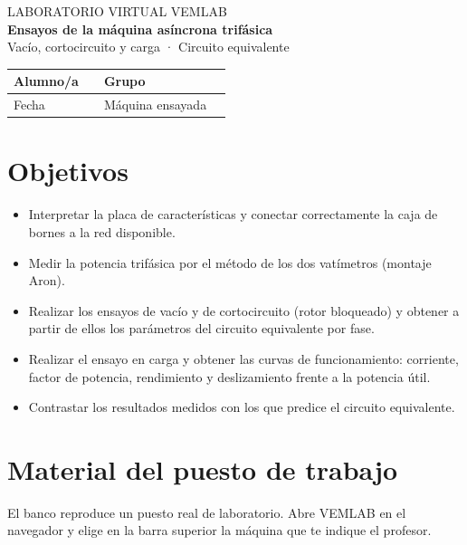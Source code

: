 \documentclass[11pt,a4paper]{article}
\begin{document}
\begin{center}
  {\sffamily\small\color{acento} LABORATORIO VIRTUAL VEMLAB}\\[4pt]
  {\sffamily\LARGE\bfseries Ensayos de la máquina asíncrona trifásica}\\[4pt]
  {\sffamily\large Vacío, cortocircuito y carga · Circuito equivalente}
\end{center}

\vspace{6pt}
\begin{tabularx}{\textwidth}{|l|X|l|X|}
  \hline
  \textsf{Alumno/a} & & \textsf{Grupo} & \\ \hline
  \textsf{Fecha} & & \textsf{Máquina ensayada} & \\ \hline
\end{tabularx}

\section{Objetivos}
\begin{itemize}
  \item Interpretar la placa de características y conectar correctamente la caja de bornes a la red disponible.
  \item Medir la potencia trifásica por el método de los dos vatímetros (montaje Aron).
  \item Realizar los ensayos de vacío y de cortocircuito (rotor bloqueado) y obtener a partir de ellos los parámetros del circuito equivalente por fase.
  \item Realizar el ensayo en carga y obtener las curvas de funcionamiento: corriente, factor de potencia, rendimiento y deslizamiento frente a la potencia útil.
  \item Contrastar los resultados medidos con los que predice el circuito equivalente.
\end{itemize}

\section{Material del puesto de trabajo}
El banco reproduce un puesto real de laboratorio. Abre VEMLAB en el navegador y elige en la barra superior la máquina que te indique el profesor.
\end{document}
